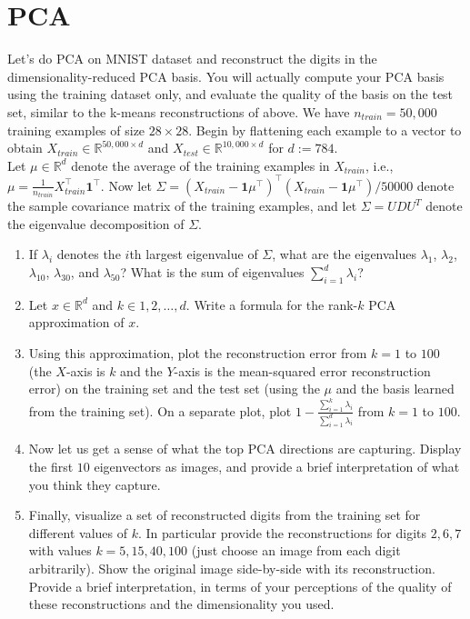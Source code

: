 \documentclass{article}
\begin{document}
\section*{PCA}
\begin{aprob}
Let's do PCA on MNIST dataset and reconstruct the digits in the dimensionality-reduced PCA basis. You will actually compute your PCA basis using the training dataset only, and evaluate the quality of the basis on the test set, similar to the k-means reconstructions of above. 
We have $n_{train}=50,000$ training examples of size $28 \times 28$. Begin by flattening each example to a vector to obtain $X_{train} \in \mathbb{R}^{50,000 \times d}$ and $X_{test} \in \mathbb{R}^{10,000 \times d}$ for $d:= 784$. \\

Let $\mu \in \mathbb{R}^{d}$ denote the average of the training examples in $X_{train}$, i.e., $\mu = \frac{1}{n_{train}} X_{train}^\top \mathbf{1}^\top$. Now let $\Sigma =  (X_{train} - \mathbf{1} \mu^\top)^\top (X_{train} - \mathbf{1} \mu^\top)/50000$ denote the sample covariance matrix of the training examples, and let $\Sigma = UDU^T$ denote the eigenvalue decomposition of $\Sigma$.
\begin{enumerate}
\item {}
    If $\lambda_i$ denotes the $i$th largest eigenvalue of $\Sigma$, what are the eigenvalues $\lambda_1$, $\lambda_2$, $\lambda_{10}$, $\lambda_{30}$, and $\lambda_{50}$? What is the sum of eigenvalues $\sum_{i=1}^d{\lambda_i}$?
 
\item {}
    Let $x \in \mathbb{R}^d$ and $k \in 1,2,\dots,d$. Write a formula for the rank-$k$ PCA approximation of $x$.
 
\item {} Using this approximation, plot the reconstruction error from $k=1$ to $100$ (the $X$-axis is $k$ and the $Y$-axis is the mean-squared error reconstruction error) on the training set and the test set (using the $\mu$ and the basis learned from the training set). 
    On a separate plot, plot  $1-\frac{\sum_{i=1}^{k}{\lambda_i}}{\sum_{i=1}^{d}{\lambda_i}}$ from $k=1$ to $100$.
    
\item {}
    Now let us get a sense of what the top PCA directions are capturing. Display the first $10$ eigenvectors as images, and provide a brief interpretation of what you think they capture.
    
\item {}
    Finally, visualize a set of reconstructed digits from the training set for different values of $k$. In particular provide the reconstructions for digits $2,6,7$ with values $k = 5, 15, 40, 100$ (just choose an image from each digit arbitrarily). Show the original image side-by-side with its reconstruction. Provide a brief interpretation, in terms of your perceptions of the quality of these reconstructions and the dimensionality you used.
    

\end{enumerate}
\end{aprob}
\end{document}
